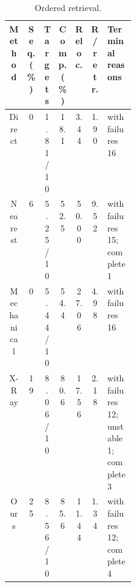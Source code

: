 \begin{table}[htbp]
  \centering
  \caption{Ordered retrieval.}
  \label{tab:fresh_mujoco_ordered_sequence_full}
  \footnotesize
  \setlength{\tabcolsep}{3.0pt}
  \begin{tabular}{cccccc>{\centering\arraybackslash}p{0.24\linewidth}}
    \toprule
    Method & Seq. (\%) & Targets & Comp. (\%) & Reloc. & R/retr. & Terminal reasons \\
    \midrule
    Direct & 0 & 1.81/10 & 18.1 & 3.44 & 1.90 & with failures 16 \\
    Nearest & 6 & 5.25/10 & 52.5 & 50.00 & 9.52 & with failures 15; complete 1 \\
    Mechanical & 0 & 5.44/10 & 54.4 & 27.06 & 4.98 & with failures 16 \\
    X-Ray & 19 & 8.06/10 & 80.6 & 17.56 & 2.18 & with failures 12; unstable 1; complete 3 \\
    Ours & 25 & 8.56/10 & 85.6 & 11.44 & 1.34 & with failures 12; complete 4 \\
    \bottomrule
  \end{tabular}
\end{table}
